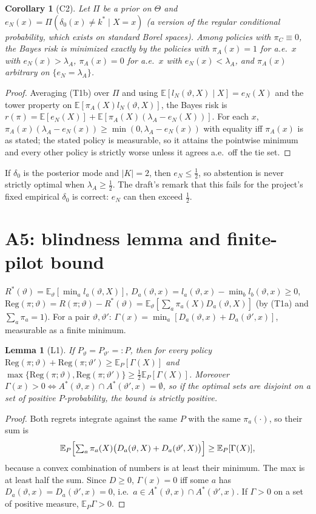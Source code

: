 \documentclass[11pt,a4paper]{article}
\newtheorem{lemma}[theorem]{Lemma}
\newtheorem{corollary}[theorem]{Corollary}
\theoremstyle{definition}
\theoremstyle{remark}
\newcommand{\E}{\mathbb{E}}
\newcommand{\vt}{\vartheta}
\newcommand{\lA}{\lambda_A}
\begin{document}
\begin{corollary}[C2]\label{cor:C2}
Let $\Pi$ be a prior on $\Theta$ and $e_N(x)=\Pi(\delta_0(x)\neq k^*\mid X=x)$ (a version of
the regular conditional probability, which exists on standard Borel spaces). Among
policies with $\pi_C\equiv0$, the Bayes risk is minimized exactly by the policies with
$\pi_A(x)=1$ for a.e.\ $x$ with $e_N(x)>\lA$, $\pi_A(x)=0$ for a.e.\ $x$ with
$e_N(x)<\lA$, and $\pi_A(x)$ arbitrary on $\{e_N=\lA\}$.
\end{corollary}
\begin{proof}
Averaging (T1b) over $\Pi$ and using $\E[l_N(\vt,X)\mid X]=e_N(X)$ and the tower property
on $\E[\pi_A(X)l_N(\vt,X)]$, the Bayes risk is
$r(\pi)=\E[e_N(X)]+\E[\pi_A(X)(\lA-e_N(X))]$. For each $x$,
$\pi_A(x)(\lA-e_N(x))\ge\min(0,\lA-e_N(x))$ with equality iff $\pi_A(x)$ is as stated;
the stated policy is measurable, so it attains the pointwise minimum and every other
policy is strictly worse unless it agrees a.e.\ off the tie set.
\end{proof}
If $\delta_0$ is the posterior mode and $|K|=2$, then $e_N\le\tfrac12$, so abstention is
never strictly optimal when $\lA\ge\tfrac12$. The draft's remark that this fails for the
project's fixed empirical $\delta_0$ is correct: $e_N$ can then exceed $\tfrac12$.

\section{A5: blindness lemma and finite-pilot bound}

$R^*(\vt)=\E_\vt[\min_al_a(\vt,X)]$,
$D_a(\vt,x)=l_a(\vt,x)-\min_bl_b(\vt,x)\ge0$,
$\mathrm{Reg}(\pi;\vt)=R(\pi;\vt)-R^*(\vt)=\E_\vt[\sum_a\pi_a(X)D_a(\vt,X)]$ (by (T1a)
and $\sum_a\pi_a=1$). For a pair $\vt,\vt'$:
$\Gamma(x)=\min_a[D_a(\vt,x)+D_a(\vt',x)]$, measurable as a finite minimum.

\begin{lemma}[L1]\label{lem:L1}
If $P_\vt=P_{\vt'}=:P$, then for every policy
$\mathrm{Reg}(\pi;\vt)+\mathrm{Reg}(\pi;\vt')\ge\E_P[\Gamma(X)]$ and
$\max\{\mathrm{Reg}(\pi;\vt),\mathrm{Reg}(\pi;\vt')\}\ge\tfrac12\E_P[\Gamma(X)]$.
Moreover $\Gamma(x)>0\iff A^*(\vt,x)\cap A^*(\vt',x)=\emptyset$, so if the optimal sets
are disjoint on a set of positive $P$-probability, the bound is strictly positive.
\end{lemma}
\begin{proof}
Both regrets integrate against the same $P$ with the same $\pi_a(\cdot)$, so their sum is
\[\E_P\Bigl[\textstyle\sum_a\pi_a(X)\bigl(D_a(\vt,X)+D_a(\vt',X)\bigr)\Bigr]\ge\E_P[\Gamma(X)],\]
because a convex
combination of numbers is at least their minimum. The max is at least half the sum.
Since $D\ge0$, $\Gamma(x)=0$ iff some $a$ has $D_a(\vt,x)=D_a(\vt',x)=0$, i.e.\
$a\in A^*(\vt,x)\cap A^*(\vt',x)$. If $\Gamma>0$ on a set of positive measure,
$\E_P\Gamma>0$.
\end{proof}
\end{document}
